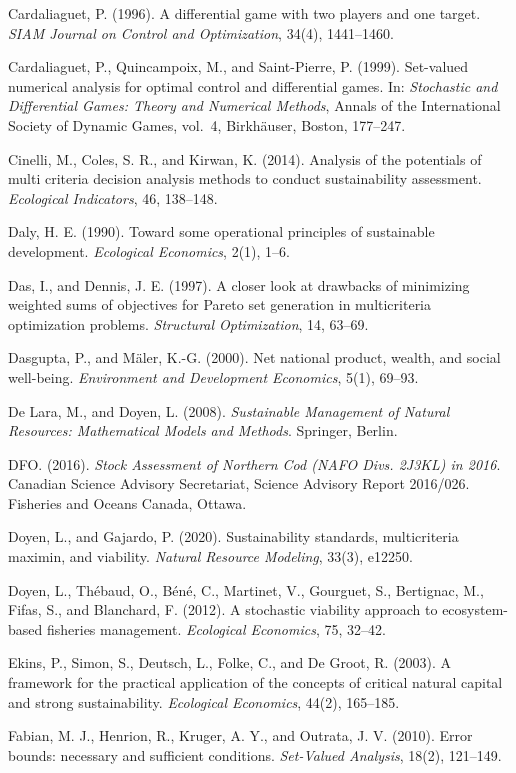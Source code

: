 \documentclass[3p,11pt]{elsarticle}
\begin{document}
Cardaliaguet, P. (1996). A differential game with two players and one target. \emph{SIAM Journal on Control and Optimization}, 34(4), 1441--1460.

Cardaliaguet, P., Quincampoix, M., and Saint-Pierre, P. (1999). Set-valued numerical analysis for optimal control and differential games. In: \emph{Stochastic and Differential Games: Theory and Numerical Methods}, Annals of the International Society of Dynamic Games, vol.~4, Birkh\"auser, Boston, 177--247.

Cinelli, M., Coles, S. R., and Kirwan, K. (2014). Analysis of the
potentials of multi criteria decision analysis methods to conduct
sustainability assessment. \emph{Ecological Indicators}, 46, 138--148.

Daly, H. E. (1990). Toward some operational principles of sustainable
development. \emph{Ecological Economics}, 2(1), 1--6.

Das, I., and Dennis, J. E. (1997). A closer look at drawbacks of
minimizing weighted sums of objectives for Pareto set generation in
multicriteria optimization problems. \emph{Structural Optimization}, 14,
63--69.

Dasgupta, P., and M\"aler, K.-G. (2000). Net national product, wealth, and
social well-being. \emph{Environment and Development Economics}, 5(1),
69--93.

De Lara, M., and Doyen, L. (2008). \emph{Sustainable Management of Natural Resources: Mathematical Models and Methods}. Springer, Berlin.

DFO. (2016). \emph{Stock Assessment of Northern Cod (NAFO Divs. 2J3KL) in 2016}. Canadian Science Advisory Secretariat, Science Advisory Report 2016/026. Fisheries and Oceans Canada, Ottawa.

Doyen, L., and Gajardo, P. (2020). Sustainability standards,
multicriteria maximin, and viability. \emph{Natural Resource Modeling},
33(3), e12250.

Doyen, L., Th\'ebaud, O., B\'en\'e, C., Martinet, V., Gourguet, S., Bertignac, M., Fifas, S., and Blanchard, F. (2012). A stochastic viability approach to ecosystem-based fisheries management. \emph{Ecological Economics}, 75, 32--42.

Ekins, P., Simon, S., Deutsch, L., Folke, C., and De Groot, R. (2003). A
framework for the practical application of the concepts of critical
natural capital and strong sustainability. \emph{Ecological Economics},
44(2), 165--185.

Fabian, M. J., Henrion, R., Kruger, A. Y., and Outrata, J. V. (2010). Error bounds: necessary and sufficient conditions. \emph{Set-Valued Analysis}, 18(2), 121--149.
\end{document}
